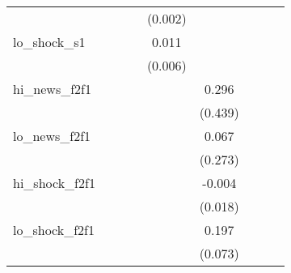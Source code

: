 {\begin{tabular}{l*{8}{c}}
            &                     &                     &                     &     (0.002)         &                     &                     &                     &                     \\
\addlinespace
lo\_shock\_s1 &                     &                     &                     &       0.011\sym{*}  &                     &                     &                     &                     \\
            &                     &                     &                     &     (0.006)         &                     &                     &                     &                     \\
\addlinespace
hi\_news\_f2f1&                     &                     &                     &                     &       0.296         &                     &                     &                     \\
            &                     &                     &                     &                     &     (0.439)         &                     &                     &                     \\
\addlinespace
lo\_news\_f2f1&                     &                     &                     &                     &       0.067         &                     &                     &                     \\
            &                     &                     &                     &                     &     (0.273)         &                     &                     &                     \\
\addlinespace
hi\_shock\_f2f1&                     &                     &                     &                     &      -0.004         &                     &                     &                     \\
            &                     &                     &                     &                     &     (0.018)         &                     &                     &                     \\
\addlinespace
lo\_shock\_f2f1&                     &                     &                     &                     &       0.197\sym{**} &                     &                     &                     \\
            &                     &                     &                     &                     &     (0.073)         &                     &                     &                     \\

\end{tabular}}
